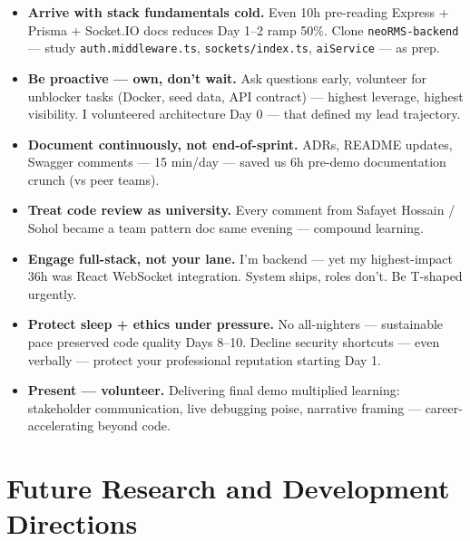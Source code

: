 \begin{itemize}
\item \textbf{Arrive with stack fundamentals cold.} Even 10h pre-reading Express + Prisma + Socket.IO docs reduces Day 1--2 ramp 50\%. Clone \texttt{neoRMS-backend} --- study \texttt{auth.middleware.ts}, \texttt{sockets/index.ts}, \texttt{aiService} --- as prep.
\item \textbf{Be proactive --- own, don't wait.} Ask questions early, volunteer for unblocker tasks (Docker, seed data, API contract) --- highest leverage, highest visibility. I volunteered architecture Day 0 --- that defined my lead trajectory.
\item \textbf{Document continuously, not end-of-sprint.} ADRs, README updates, Swagger comments --- 15 min/day --- saved us 6h pre-demo documentation crunch (vs peer teams).
\item \textbf{Treat code review as university.} Every comment from Safayet Hossain / Sohol became a team pattern doc same evening --- compound learning.
\item \textbf{Engage full-stack, not your lane.} I'm backend --- yet my highest-impact 36h was React WebSocket integration. System ships, roles don't. Be T-shaped urgently.
\item \textbf{Protect sleep + ethics under pressure.} No all-nighters --- sustainable pace preserved code quality Days 8--10. Decline security shortcuts --- even verbally --- protect your professional reputation starting Day 1.
\item \textbf{Present --- volunteer.} Delivering final demo multiplied learning: stakeholder communication, live debugging poise, narrative framing --- career-accelerating beyond code.
\end{itemize}

\section{Future Research and Development Directions}

